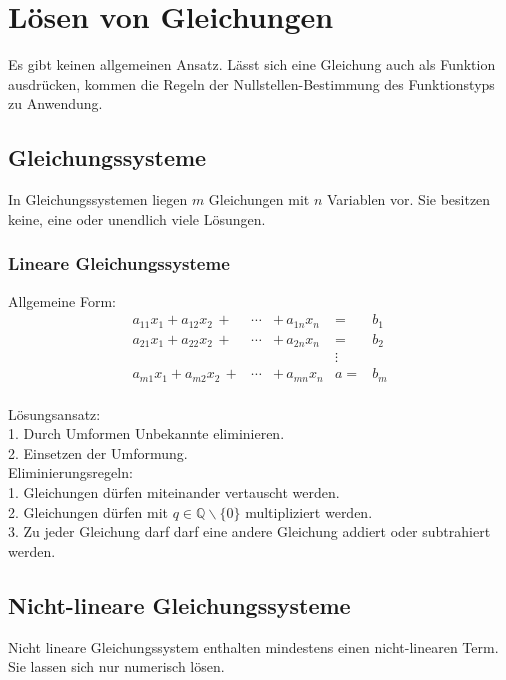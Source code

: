 \section{Lösen von Gleichungen}
Es gibt keinen allgemeinen Ansatz. Lässt sich eine Gleichung auch als Funktion ausdrücken, kommen die Regeln der Nullstellen-Bestimmung des Funktionstyps zu Anwendung.

\subsection{Gleichungssysteme}
In Gleichungssystemen liegen $m$ Gleichungen mit $n$ Variablen vor. Sie besitzen keine, eine oder unendlich viele Lösungen.

\subsubsection{Lineare Gleichungssysteme}
Allgemeine Form:
\begin{equation*}
\begin{matrix}
a_{11} x_1 +  a_{12} x_2 \, + & \cdots & +\, a_{1n} x_n & = & b_1\\
a_{21} x_1 +  a_{22} x_2 \, + & \cdots & +\, a_{2n} x_n & = & b_2\\
&&&\vdots&\\
a_{m1} x_1 +  a_{m2} x_2 \, + & \cdots & +\, a_{mn} x_n &a = & b_m\\
\end{matrix}
\end{equation*}

Lösungsansatz:\\
1. Durch Umformen Unbekannte eliminieren.\\
2. Einsetzen der Umformung.\\

Eliminierungsregeln:\\
1. Gleichungen dürfen miteinander vertauscht werden.\\
2. Gleichungen dürfen mit $q \in \mathbb{Q} \backslash \{0\}$ multipliziert werden.\\
3. Zu jeder Gleichung darf darf eine andere Gleichung addiert oder subtrahiert werden.\\

\subsection{Nicht-lineare Gleichungssysteme}
Nicht lineare Gleichungssystem enthalten mindestens einen nicht-linearen Term. Sie lassen sich nur numerisch lösen.
